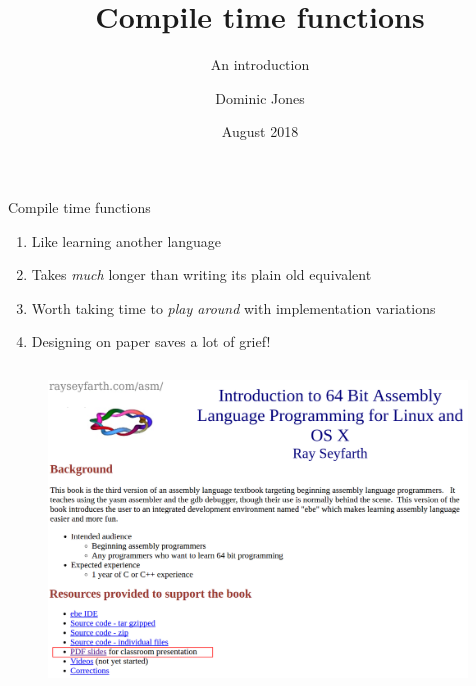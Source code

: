 \documentclass[xcolor=dvipsnames]{beamer}
\title{Compile time functions}
\subtitle{An introduction}
\author{Dominic Jones}
\date{\small{August 2018}}
\institute{\small{\texttt{github.com/DominicJones}}}
\begin{document}
\begin{frame}[plain]
  \titlepage
\end{frame}


\begin{frame}[fragile]{Compile time functions}
  \begin{enumerate}
  \item Like learning another language \vspace{5mm}
  \item Takes \emph{much} longer than writing its plain old equivalent \vspace{5mm}
  \item Worth taking time to \emph{play around} with implementation variations \vspace{5mm}
  \item Designing on paper saves a lot of grief! \vspace{5mm}
  \end{enumerate}
\end{frame}


\begin{frame}[plain]
  \begin{columns}[T] %
    \begin{column}{0.9\textwidth}
      \begin{figure}[H]
        \centering
        \includegraphics[width=0.99\textwidth]{ray_seyfarth}
      \end{figure}
    \end{column}%
  \end{columns}
\end{frame}
\end{document}
